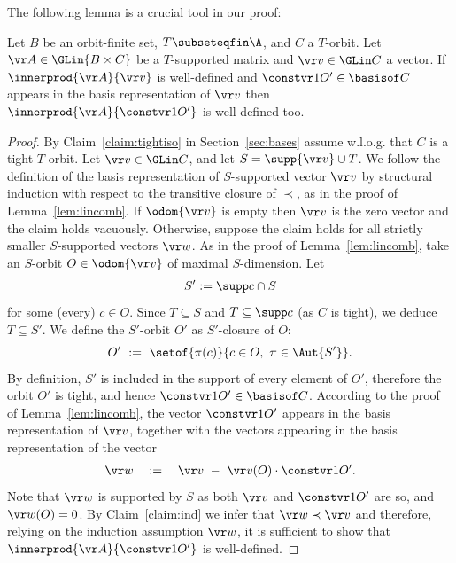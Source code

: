 The following lemma is a crucial tool in our proof: %
\begin{lemma} \label{lem:wd}
Let $B$ be an orbit-finite set, $T\subseteqfin\A$, and $C$ a $T$-orbit.
Let $\vr A \in \GLin{B\times C}$
be a $T$-supported matrix and $\vr v \in \GLin C$ a vector.
If $\innerprod{\vr A}{\vr v}$ is well-defined and $\constvr 1 {O'} \in\basisof C$ appears in the basis representation of $\vr v$
then $\innerprod{\vr A}{\constvr 1 {O'}}$ is well-defined too.
\end{lemma}
%
\begin{proof}
By Claim~\ref{claim:tightiso} in Section~\ref{sec:bases} assume w.l.o.g. that $C$ is a tight $T$-orbit.
Let $\vr v\in \GLin C$, and let $S = \supp {\vr v} \cup T$.
We follow the definition of the basis representation of $S$-supported vector $\vr v$ 
by structural induction with respect to the transitive closure of $\prec$,
as in the proof of Lemma~\ref{lem:lincomb}.
If $\odom {\vr v}$ is empty
then $\vr v$ is the zero vector and the claim holds vacuously.
Otherwise, suppose the claim holds for all strictly smaller $S$-supported vectors $\vr w$.
As in the proof of Lemma~\ref{lem:lincomb},
take an $S$-orbit $O\in\odom{\vr v}$ of maximal $S$-dimension. %
Let 
\begin{align}\label{eq:crucial}
S' := \supp c \cap S
\end{align}
for some (every) $c\in O$.
Since $T\subseteq S$ and $T\subseteq \supp c$ (as $C$ is tight), we deduce $T\subseteq S'$.
We define the $S'$-orbit $O'$ as $S'$-closure of $O$:
\[
O' \ := \ \setof{\pi(c)}{c\in O, \ \pi \in\Aut {S'}}.
\]
By definition, $S'$ is included in the support of every element of $O'$, therefore the orbit $O'$ is tight,
and hence $\constvr 1 {O'}\in \basisof C$.
According to the proof of Lemma~\ref{lem:lincomb}, the vector $\constvr 1 {O'}$
appears in the basis representation of $\vr v$, together with the vectors appearing in the basis representation of the vector
%
\begin{align} \label{eq:v'}
\vr w \quad := \quad \vr v \ - \ \vr v(O) \cdot \constvr 1 {O'}.
\end{align}
%
Note that $\vr w$ is supported by $S$ as both $\vr v$ and $\constvr 1 {O'}$ are so, and
$\vr w(O) = 0$.
By Claim~\ref{claim:ind} we infer that $\vr w \prec \vr v$
and therefore, relying on the induction assumption $\vr w$,
it is sufficient to show that $\innerprod{\vr A}{\constvr 1 {O'}}$ is well-defined.


\end{proof}
